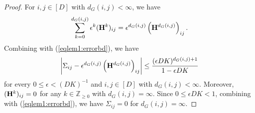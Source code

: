 \documentclass[10pt,a4paper]{amsart}
\newcommand{\bH}{{\bf H}}
\newcommand{\bbZ}{{\mathbb Z}}
\newcommand{\bean}{\setlength\arraycolsep{1pt}\begin{eqnarray*}}
\newcommand{\eean}{\end{eqnarray*}}
\begin{document}
\begin{proof}
For $i,j \in [D]$ with $d_{G}(i,j) < \infty$, we have
\bean
\sum_{k=0}^{d_{G}(i,j)} \epsilon^{k} (\bH^{k})_{ij} = \epsilon^{d_{G}(i,j)} \left( \bH^{d_{G}(i,j)} \right)_{ij}.
\eean
Combining with (\ref{eqlem1:errorbd}), we have
\bean
\left\vert \Sigma_{ij} -  \epsilon^{d_{G}(i,j)} \left( \bH^{d_{G}(i,j)} \right)_{ij}  \right\vert
\leq
 \frac{(\epsilon D K)^{d_{G}(i,j)+1}}{1-\epsilon D K}
\eean
for every $0 \leq \epsilon < (DK)^{-1}$ and $i,j \in [D]$ with $d_{G}(i,j) < \infty$.
Moreover, $(\bH^{k})_{ij} = 0$ for any $k \in \bbZ_{\geq 0}$ with $d_{G}(i,j) = \infty$.
Since $0 \leq \epsilon D K < 1$, combining with (\ref{eqlem1:errorbd}), we have $\Sigma_{ij} = 0$ for $d_{G}(i,j) = \infty$.

\end{proof}
\end{document}
